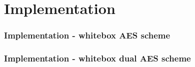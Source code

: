 \documentclass{beamer}
\begin{document}
\section{Implementation}

\begin{frame}
    \frametitle{Implementation - whitebox AES scheme}
    \centerline{}
\end{frame}

\begin{frame}
    \frametitle{Implementation - whitebox dual AES scheme}
    \centerline{}
\end{frame}
\end{document}
